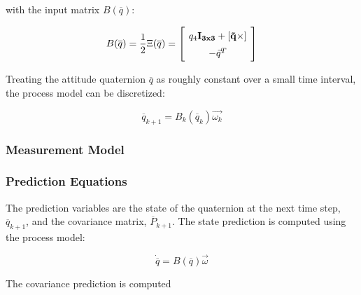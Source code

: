 \documentclass{article}
\newcommand{\mat}[2][ccccccccccccccccccccccccccccccccccccccccccccc]{\left[
        \arraycolsep=4pt\def\arraystretch{1.5}
        \begin{array}{#1} #2 \\ 
        \end{array} 
        \right]}
\begin{document}
\begin{flushleft}
with the input matrix $B(\overline{q})$: 

\[ B(\overline{q}) = \frac{1}{2} \Xi(\overline{q}) = \mat{q_4 \bf{I}_{3x3} + [\vec{q}\times] \\ -\vec{q}^T } \]

Treating the attitude quaternion $\overline{q}$ as roughly constant over a small time interval, the process model can be discretized: 

\[ \overline{q}_{k+1} = B_k(\overline{q}_k) \vec{\omega_k} \]

\subsubsection{Measurement Model}

\subsubsection{Prediction Equations}

The prediction variables are the state of the quaternion at the next time step, $\overline{q}_{k+1}$, and the covariance matrix, $\overline{P}_{k+1}$. The state prediction is computed using the process model: 

\[ \dot{\overline{q}} = B(\overline{q}) \vec{\omega} \]

The covariance prediction is computed 






\end{flushleft}
\end{document}
